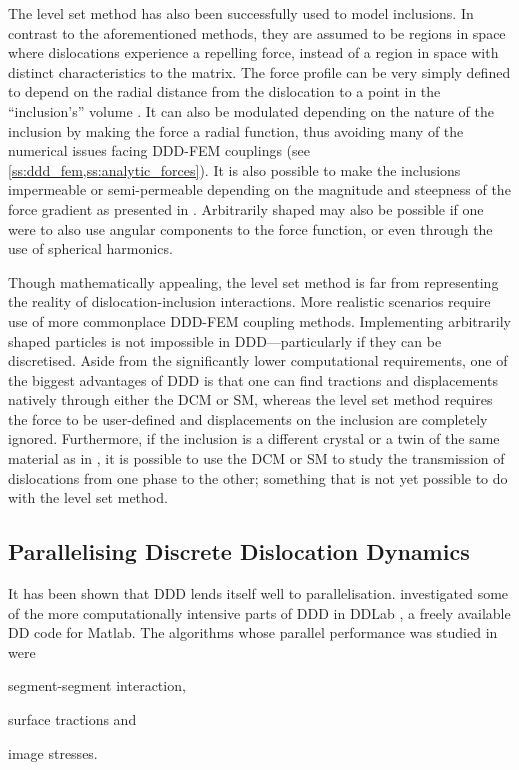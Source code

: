 The level set method has also been successfully used to model inclusions. In contrast to the aforementioned methods, they are assumed to be regions in space where dislocations experience a repelling force, instead of a region in space with distinct characteristics to the matrix. The force profile can be very simply defined to depend on the radial distance from the dislocation to a point in the ``inclusion's'' volume \cite{ddd_inclusion_as_force}. It can also be modulated depending on the nature of the inclusion by making the force a radial function, thus avoiding many of the numerical issues facing DDD-FEM couplings (see \cref{ss:ddd_fem,ss:analytic_forces}). It is also possible to make the inclusions impermeable or semi-permeable depending on the magnitude and steepness of the force gradient as presented in \cite{ddd_inclusion_as_force}. Arbitrarily shaped may also be possible if one were to also use angular components to the force function, or even through the use of spherical harmonics.

Though mathematically appealing, the level set method is far from representing the reality of dislocation-inclusion interactions. More realistic scenarios require use of more commonplace DDD-FEM coupling methods. Implementing arbitrarily shaped particles is not impossible in DDD---particularly if they can be discretised. Aside from the significantly lower computational requirements, one of the biggest advantages of DDD is that one can find tractions and displacements natively through either the DCM or SM, whereas the level set method requires the force to be user-defined and displacements on the inclusion are completely ignored. Furthermore, if the inclusion is a different crystal or a twin of the same material as in \cite{twinning}, it is possible to use the DCM or SM to study the transmission of dislocations from one phase to the other; something that is not yet possible to do with the level set method.

\subsection{Parallelising Discrete Dislocation Dynamics}
\label{ss:parallel_ddd}
It has been shown that DDD lends itself well to parallelisation.  investigated some of the more computationally intensive parts of DDD in DDLab \cite{ddlab}, a freely available DD code for Matlab. The algorithms whose parallel performance was studied in \cite{gpu_ddd} were
\begin{inparaenum}
	\item segment-segment interaction,
	\item surface tractions and
	\item image stresses.
\end{inparaenum}

